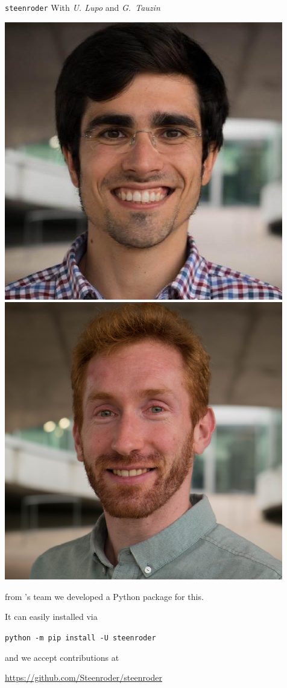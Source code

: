 \begin{frame}{\texttt{steenroder}}
	\pause
	With \textit{U. Lupo} and \textit{G.~Tauzin}

	\begin{center}
		\includegraphics[scale=.2]{aux/umberto}
		\qquad
		\includegraphics[scale=.2]{aux/guillaume}
	\end{center}

	from 's team we developed a Python package for this.

	\pause\smallskip
	It can easily installed via
	\begin{center}
		\texttt{python -m pip install -U steenroder}
	\end{center}

	and we accept contributions at
	\begin{center}
		\url{https://github.com/Steenroder/steenroder}
	\end{center}
\end{frame}

